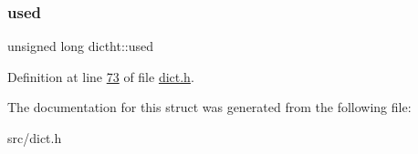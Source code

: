 \mbox{\label{structdictht_ab67ac2d13aa52a10fb0085f93cf3d4dd}} 
\subsubsection{\texorpdfstring{used}{used}}
{\footnotesize\ttfamily unsigned long dictht\+::used}



Definition at line \hyperlink{dict_8h_source_l00073}{73} of file \hyperlink{dict_8h_source}{dict.\+h}.



The documentation for this struct was generated from the following file\+:\begin{DoxyCompactItemize}
\item 
src/dict.\+h\end{DoxyCompactItemize}

